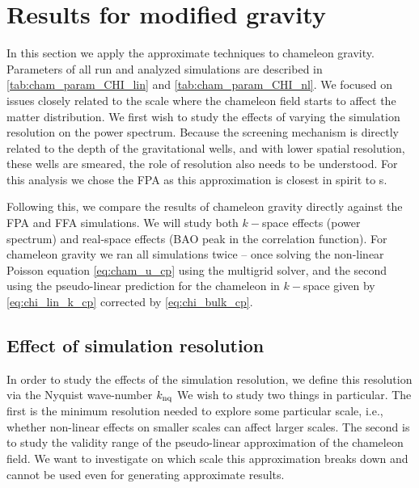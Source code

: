 \section{Results for modified gravity}
\newcommand{\chileft}{\hspace*{-1cm}}
In this section we apply the approximate techniques to chameleon gravity. Parameters of all run and analyzed simulations are described in \autoref{tab:cham_param_CHI_lin} and \autoref{tab:cham_param_CHI_nl}. We focused on issues closely related to the scale where the chameleon field starts to affect the matter distribution. We first wish to study the effects of varying the simulation resolution on the power spectrum. Because the screening mechanism is directly related to the depth of the gravitational wells, and with lower spatial resolution, these wells are smeared, the role of resolution also needs to be understood. For this analysis we chose the FPA as this approximation is closest in spirit to \nbodysim s.

Following this, we compare the results of chameleon gravity directly against the FPA and FFA simulations. %
We will study both $k-$space effects (power spectrum) and real-space effects (BAO peak in the correlation function). For chameleon gravity we ran all simulations twice -- once solving the non-linear Poisson equation \eqref{eq:cham_u_cp} using the multigrid solver, and the second using the pseudo-linear prediction for the chameleon in $k-$space given by \eqref{eq:chi_lin_k_cp} corrected by \eqref{eq:chi_bulk_cp}.

\subsection{Effect of simulation resolution}
In order to study the effects of the simulation resolution, we define this resolution via the Nyquist wave-number $k_{\rm nq}$
We wish to study two things in particular. The first is the minimum resolution needed to explore some particular scale, i.e., whether non-linear effects on smaller scales can affect larger scales. The second is to study the validity range of the pseudo-linear approximation of the chameleon field. We want to investigate on which scale this approximation breaks down and cannot be used even for generating approximate results.

